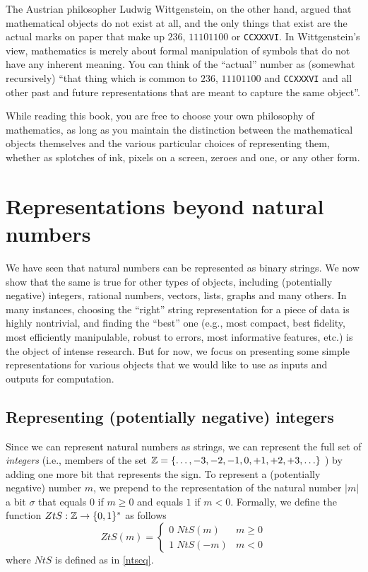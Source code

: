 The Austrian philosopher Ludwig Wittgenstein, on the other hand, argued
that mathematical objects do not exist at all, and the only things that
exist are the actual marks on paper that make up \(236\), \(11101100\)
or \texttt{CCXXXVI}. In Wittgenstein's view, mathematics is merely about
formal manipulation of symbols that do not have any inherent meaning.
You can think of the ``actual'' number as (somewhat recursively) ``that
thing which is common to \(236\), \(11101100\) and \texttt{CCXXXVI} and
all other past and future representations that are meant to capture the
same object''.

While reading this book, you are free to choose your own philosophy of
mathematics, as long as you maintain the distinction between the
mathematical objects themselves and the various particular choices of
representing them, whether as splotches of ink, pixels on a screen,
zeroes and one, or any other form.

\section{Representations beyond natural
numbers}\label{Representations-beyond-na}

We have seen that natural numbers can be represented as binary strings.
We now show that the same is true for other types of objects, including
(potentially negative) integers, rational numbers, vectors, lists,
graphs and many others. In many instances, choosing the ``right'' string
representation for a piece of data is highly nontrivial, and finding the
``best'' one (e.g., most compact, best fidelity, most efficiently
manipulable, robust to errors, most informative features, etc.) is the
object of intense research. But for now, we focus on presenting some
simple representations for various objects that we would like to use as
inputs and outputs for computation.

\subsection{Representing (potentially negative)
integers}\label{repnegativeintegerssec}

Since we can represent natural numbers as strings, we can represent the
full set of \emph{integers} (i.e., members of the set
\({\mathbb{Z}}=\{ \ldots, -3 , -2 , -1 , 0 , +1, +2, +3,\ldots \}\) ) by adding
one more bit that represents the sign. To represent a (potentially
negative) number \(m\), we prepend to the representation of the natural
number \(|m|\) a bit \(\sigma\) that equals \(0\) if \(m \geq 0\) and
equals \(1\) if \(m<0\). Formally, we define the function
\(ZtS:{\mathbb{Z}} \rightarrow \{0,1\}^*\) as follows \[ZtS(m) = \begin{cases}
0\;NtS(m) & m \geq 0  \\
1\;NtS(-m) & m < 0
\end{cases}\] where \(NtS\) is defined as in \eqref{ntseq}.

